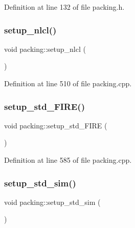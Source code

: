Definition at line 132 of file packing.\+h.

\mbox{\label{classpacking_a1f49ca3dbade782f8da82c946a2be238}} 
\subsubsection{\texorpdfstring{setup\+\_\+nlcl()}{setup\_nlcl()}}
{\footnotesize\ttfamily void packing\+::setup\+\_\+nlcl (\begin{DoxyParamCaption}{ }\end{DoxyParamCaption})}



Definition at line 510 of file packing.\+cpp.

\mbox{\label{classpacking_a02683527b4a5e41e2b9eaac44672cf9f}} 
\subsubsection{\texorpdfstring{setup\+\_\+std\+\_\+\+F\+I\+R\+E()}{setup\_std\_FIRE()}}
{\footnotesize\ttfamily void packing\+::setup\+\_\+std\+\_\+\+F\+I\+RE (\begin{DoxyParamCaption}{ }\end{DoxyParamCaption})}



Definition at line 585 of file packing.\+cpp.

\mbox{\label{classpacking_afc22f53f3fa942d5347a3ebfeacae2bf}} 
\subsubsection{\texorpdfstring{setup\+\_\+std\+\_\+sim()}{setup\_std\_sim()}}
{\footnotesize\ttfamily void packing\+::setup\+\_\+std\+\_\+sim (\begin{DoxyParamCaption}{ }\end{DoxyParamCaption})}



